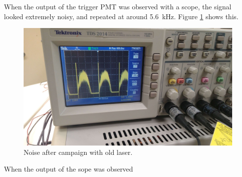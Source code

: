 

When the output of the trigger PMT was observed with a scope, the signal looked extremely noisy, and repeated at around \SI{5.6}{\kilo\hertz}. Figure \ref{fig:PPDScopeNoise} shows this.

\begin{figure}[H]
\begin{center}
\includegraphics[width=0.5\linewidth]{Figures/PPDScopeNoise}
\end{center}
\caption{Noise after campaign with old laser.}
\label{fig:PPDScopeNoise}
\end{figure}

When the output of the sope was observed
